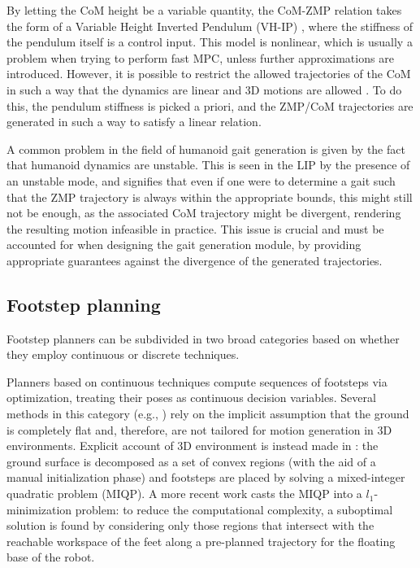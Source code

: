 By letting the CoM height be a variable quantity, the CoM-ZMP relation takes the form of a Variable Height Inverted Pendulum (VH-IP) \cite{Caron2019CapturabilitybasedPatternGeneration}, where the stiffness of the pendulum itself is a control input. This model is nonlinear, which is usually a problem when trying to perform fast MPC, unless further approximations are introduced. However, it is possible to restrict the allowed trajectories of the CoM in such a way that the dynamics are linear and 3D motions are allowed \cite{Zamparelli2018SYROCO, Ferrari2019ECC}. To do this, the pendulum stiffness is picked a priori, and the ZMP/CoM trajectories are generated in such a way to satisfy a linear relation.

A common problem in the field of humanoid gait generation is given by the fact that humanoid dynamics are unstable. This is seen in the LIP by the presence of an unstable mode, and signifies that even if one were to determine a gait such that the ZMP trajectory is always within the appropriate bounds, this might still not be enough, as the associated CoM trajectory might be divergent, rendering the resulting motion infeasible in practice. This issue is crucial and must be accounted for when designing the gait generation module, by providing appropriate guarantees against the divergence of the generated trajectories.

\subsection{Footstep planning}

Footstep planners can be subdivided in two broad categories based on whether they employ continuous or discrete techniques.

Planners based on continuous techniques compute sequences of footsteps via optimization, treating their poses as continuous decision variables. 
Several methods in this category (e.g., \cite{Ibanez2014IROS, Hong2011TSMC, Kasadei2021SNAS}) rely on the implicit assumption that the ground is completely flat and, therefore, are not tailored for motion generation in 3D environments.
Explicit account of 3D environment is instead made in \cite{Deits2014FootstepPlanningMIQCQP}: the ground surface is decomposed as a set of convex regions (with the aid of a manual initialization phase) and footsteps are placed by solving a mixed-integer quadratic problem (MIQP). 
A more recent work \cite{Song2021RAL} casts the MIQP into a $l_1$-minimization problem: 
to reduce the computational complexity, a suboptimal solution is found by considering only those regions that intersect with the reachable workspace of the feet along a pre-planned trajectory for the floating base of the robot.

